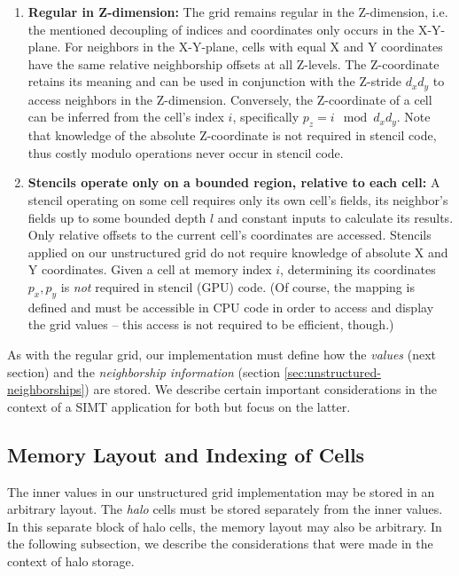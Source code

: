 \begin{enumerate}
    \item \textbf{Regular in Z-dimension:} The grid remains regular in the Z-dimension, i.e. the mentioned decoupling of indices and coordinates only occurs in the X-Y-plane. For neighbors in the X-Y-plane, cells with equal X and Y coordinates have the same relative neighborship offsets at all Z-levels. The Z-coordinate retains its meaning and can be used in conjunction with the Z-stride $d_xd_y$ to access neighbors in the Z-dimension. Conversely, the Z-coordinate of a cell can be inferred from the cell's index $i$, specifically $p_z = i \mod d_xd_y$. Note that knowledge of the absolute Z-coordinate is not required in stencil code, thus costly modulo operations never occur in stencil code.
    \item \textbf{Stencils operate only on a bounded region, relative to each cell:} A stencil operating on some cell requires only its own cell's fields, its neighbor's fields up to some bounded depth $l$ and constant inputs to calculate its results. Only relative offsets to the current cell's coordinates are accessed. Stencils applied on our unstructured grid do not require knowledge of absolute X and Y coordinates. Given a cell at memory index $i$, determining its coordinates $p_x, p_y$ is \emph{not} required in stencil (GPU) code. (Of course, the mapping is defined and must be accessible in CPU code in order to access and display the grid values -- this access is not required to be efficient, though.) 
\end{enumerate}

As with the regular grid, our implementation must define how the \emph{values} (next section) and the \emph{neighborship information} (section \ref{sec:unstructured-neighborships}) are stored. We describe certain important considerations in the context of a SIMT application for both but focus on the latter.

\subsection{Memory Layout and Indexing of Cells} 
\label{sec:unstructured-indexing}

The inner values in our unstructured grid implementation may be stored in an arbitrary layout. The \emph{halo} cells must be stored separately from the inner values. In this separate block of halo cells, the memory layout may also be arbitrary. In the following subsection, we describe the considerations that were made in the context of halo storage.

